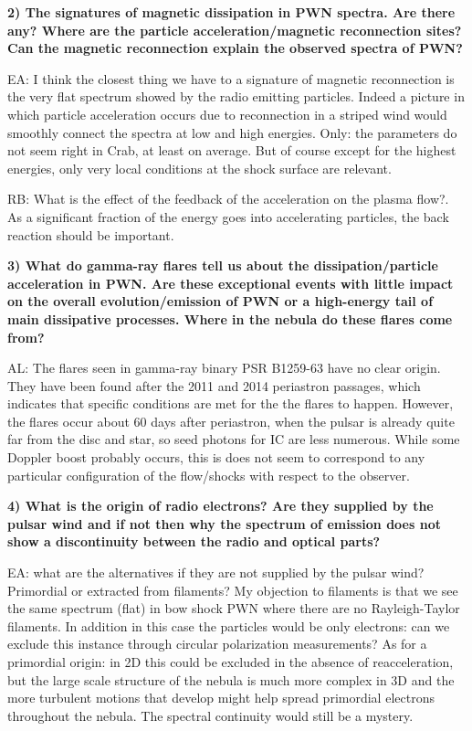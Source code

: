\textbf{2) The signatures of magnetic dissipation in PWN spectra. Are there any?  Where are the particle acceleration/magnetic reconnection sites? Can the magnetic reconnection explain the observed spectra of PWN? }

EA: I think the closest thing we have to a signature of magnetic reconnection is the very flat spectrum showed by the radio emitting particles. Indeed a picture in which particle acceleration occurs due to reconnection in a striped wind would smoothly connect the spectra at low and high energies. Only: the parameters do not seem right in Crab, at least on average. But of course except for the highest energies, only very local conditions at the shock surface are relevant.

RB: What is the effect of the feedback of the acceleration on the plasma flow?. As a significant fraction of the energy goes into accelerating particles, the back reaction should be important.

\textbf{3) What do gamma-ray flares tell us about the dissipation/particle acceleration in PWN. Are these exceptional events with little impact on the overall evolution/emission of PWN or a high-energy tail of main dissipative processes. Where in the nebula do these flares come from?  }

AL: The flares seen in gamma-ray binary PSR B1259-63 have no clear origin.  They have been found after the  2011 and 2014 periastron passages, which indicates that specific conditions are met for the the flares to happen. However, the flares occur about 60 days after periastron, when the pulsar is already quite far from the disc and star, so seed photons for IC are less numerous. While some Doppler boost probably occurs, this is does not seem to correspond to any particular configuration of the flow/shocks with respect to the observer.

\textbf{4) What is the origin of radio electrons? Are they supplied by the pulsar wind and if not then why the spectrum of emission does not show a discontinuity between the radio and optical parts? }

EA: what are the alternatives if they are not supplied by the pulsar wind? Primordial or extracted from filaments? My objection to filaments is that we see the same spectrum (flat) in bow shock PWN where there are no Rayleigh-Taylor filaments. In addition in this case the particles would be only electrons: can we exclude this instance through circular polarization measurements? As for a primordial origin: in 2D this could be excluded in the absence of reacceleration, but the large scale structure of the nebula is much more complex in 3D and the more turbulent motions that develop might help spread primordial electrons throughout the nebula. The spectral continuity would still be a mystery.

